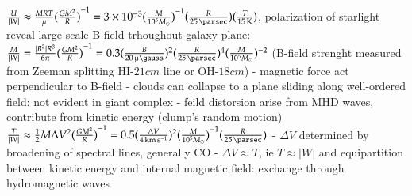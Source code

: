 \begin{itemize}
$\frac{U}{|W|}\approx\frac{MRT}{\mu}\invers{(\frac{GM^2}{R})}=\num{3e-3}\invers{(\frac{M}{\num{e5}\msun})}(\frac{R}{\SI{25}{\parsec}})(\frac{T}{\SI{15}{\kelvin}})$, polarization of starlight reveal large scale B-field trhoughout galaxy plane: $\frac{M}{|W|}=\frac{|B^2|R^3}{6\pi}\invers{(\frac{GM^2}{R})}=0.3(\frac{B}{\SI{20}{\micro\gauss}})^2(\frac{R}{\SI{25}{\parsec}})^4(\frac{M}{\num{e5}\msun})\expy{-2}$ (B-field strenght measured from Zeeman splitting HI-$21 cm$ line or OH-$18 cm$) - magnetic force act perpendicular to B-field - clouds can collapse to a plane sliding along well-ordered field: not evident in giant complex - feild distorsion arise from MHD waves, contribute from kinetic energy (clump's random motion) $\frac{T}{|W|}\approx\frac{1}{2}M\Delta V^2\invers{(\frac{GM^2}{R})}=0.5(\frac{\Delta V}{\SI{4}{\kilo\meter\per\second}})^2\invers{(\frac{M}{\num{e5}\msun})}(\frac{R}{\SI{25}{\parsec}})$ - $\Delta V$ determined by broadening of spectral lines, generally CO - $\Delta V\approx T$, ie $T\approx|W|$ and equipartition between kinetic energy and internal magnetic field: exchange through hydromagnetic waves
\end{itemize}

